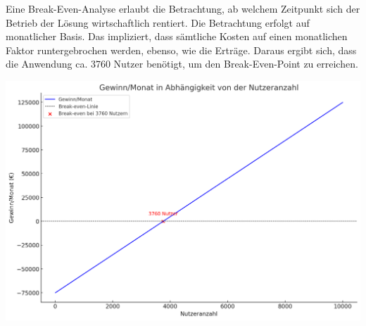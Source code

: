 Eine Break-Even-Analyse erlaubt die Betrachtung, ab welchem Zeitpunkt sich der Betrieb der Lösung wirtschaftlich rentiert.
Die Betrachtung erfolgt auf monatlicher Basis.
Das impliziert, dass sämtliche Kosten auf einen monatlichen Faktor runtergebrochen werden, ebenso, wie die Erträge.
Daraus ergibt sich, dass die Anwendung ca. 3760 Nutzer benötigt, um den Break-Even-Point zu erreichen.

\includegraphics{abbildungen/Break_Even}